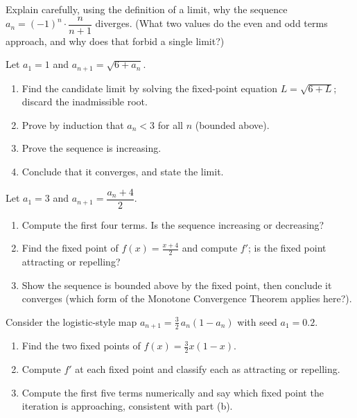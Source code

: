 \begin{exercise}
\label{ch28:exr-oscillate}
Explain carefully, using the definition of a limit, why the sequence $a_n =
(-1)^n \cdot \dfrac{n}{n+1}$ diverges. (What two values do the even and odd
terms approach, and why does that forbid a single limit?)
\end{exercise}

\begin{exercise}
\label{ch28:exr-mct-recursion}
Let $a_1 = 1$ and $a_{n+1} = \sqrt{6 + a_n}$.
\begin{enumerate}[label=(\alph*)]
  \item Find the candidate limit by solving the fixed-point equation $L =
        \sqrt{6 + L}$; discard the inadmissible root.
  \item Prove by induction that $a_n < 3$ for all $n$ (bounded above).
  \item Prove the sequence is increasing.
  \item Conclude that it converges, and state the limit.
\end{enumerate}
\end{exercise}

\begin{exercise}
\label{ch28:exr-decreasing}
Let $a_1 = 3$ and $a_{n+1} = \dfrac{a_n + 4}{2}$.
\begin{enumerate}[label=(\alph*)]
  \item Compute the first four terms. Is the sequence increasing or decreasing?
  \item Find the fixed point of $f(x) = \tfrac{x+4}{2}$ and compute $f'$; is the
        fixed point attracting or repelling?
  \item Show the sequence is bounded above by the fixed point, then conclude it
        converges (which form of the Monotone Convergence Theorem applies here?).
\end{enumerate}
\end{exercise}

\begin{exercise}
\label{ch28:exr-cobweb}
Consider the logistic-style map $a_{n+1} = \tfrac32\,a_n(1 - a_n)$ with seed
$a_1 = 0.2$.
\begin{enumerate}[label=(\alph*)]
  \item Find the two fixed points of $f(x) = \tfrac32 x(1-x)$.
  \item Compute $f'$ at each fixed point and classify each as attracting or
        repelling.
  \item Compute the first five terms numerically and say which fixed point the
        iteration is approaching, consistent with part (b).
\end{enumerate}
\end{exercise}

